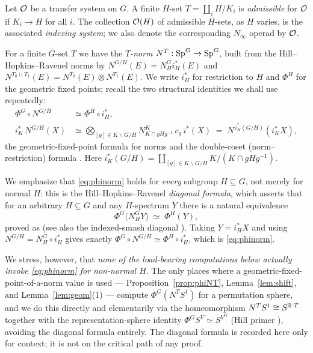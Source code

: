 \begin{qfivedefinition}
Let $\mathcal{O}$ be a transfer system on $G$. A finite $H$-set $T=\coprod_i H/K_i$ is
\emph{admissible} for $\mathcal{O}$ if $K_i\to H$ for all $i$. The collection $\mathcal{O}(H)$ of
admissible $H$-sets, as $H$ varies, is the associated \emph{indexing system}; we
also denote the corresponding $N_\infty$ operad by $\mathcal{O}$.
\end{qfivedefinition}

For a finite $G$-set $T$ we have the \emph{$T$-norm}
$N^T:\mathrm{Sp}^G\to\mathrm{Sp}^G$, built from the Hill--Hopkins--Ravenel norms \cite{HHR16}
by $N^{G/H}(E)=N^G_H i_H^\ast(E)$ and $N^{T_0\sqcup T_1}(E)=N^{T_0}(E)\otimes
N^{T_1}(E)$. We write $i_H^\ast$ for restriction to $H$ and $\Phi^H$ for the
geometric fixed points; recall the two structural identities we shall use
repeatedly:
\begin{align}
\Phi^G\circ N^{G/H} &\simeq \Phi^H\circ i_H^\ast , \label{eq:phinorm}\\
i_K^\ast\, N^{G/H}(X) &\simeq \bigotimes_{[g]\in K\backslash G/H}
   N^{K}_{K\cap gHg^{-1}}\, c_g\, i^\ast(X)
   \;=\; N^{\,i_K^\ast(G/H)}(i_K^\ast X), \label{eq:resnorm}
\end{align}
the geometric-fixed-point formula for norms \cite[Prop.~B.96]{HHR16} and the
double-coset (norm--restriction) formula \cite[Prop.~B.93]{HHR16}. Here
$i_K^\ast(G/H)=\coprod_{[g]\in K\backslash G/H} K/(K\cap gHg^{-1})$.

\begin{qfiveremark}\label{rem:phinorm-general}
We emphasize that \eqref{eq:phinorm} holds for \emph{every} subgroup
$H\subseteq G$, not merely for normal $H$: this is the Hill--Hopkins--Ravenel
\emph{diagonal formula}, which asserts that for an arbitrary $H\subseteq G$ and
any $H$-spectrum $Y$ there is a natural equivalence
\[
\Phi^G\bigl(N^G_H Y\bigr)\;\simeq\;\Phi^H(Y),
\]
proved as \cite[Prop.~B.209]{HHR16} (see also the indexed-smash diagonal
\cite[Prop.~B.96]{HHR16}). Taking $Y=i_H^\ast X$ and using
$N^{G/H}=N^G_H\circ i_H^\ast$ gives exactly
$\Phi^G\circ N^{G/H}\simeq\Phi^H\circ i_H^\ast$, which is \eqref{eq:phinorm}.

We stress, however, that \emph{none of the load-bearing computations below
actually invoke \eqref{eq:phinorm} for non-normal $H$}. The only places where a
geometric-fixed-point-of-a-norm value is used --- Proposition~\ref{prop:phiNT},
Lemma~\ref{lem:shift}, and Lemma~\ref{lem:geom}(1) --- compute $\Phi^G(N^TS^1)$
for a permutation sphere, and we do this directly and elementarily via the
homeomorphism $N^TS^1\cong S^{\mathbb{R}\cdot T}$ together with the
representation-sphere identity $\Phi^GS^V\simeq S^{V^G}$ (Hill primer
\cite[\S6]{HillPrimer}), avoiding the diagonal formula entirely. The diagonal
formula is recorded here only for context; it is not on the critical path of any
proof.
\end{qfiveremark}

